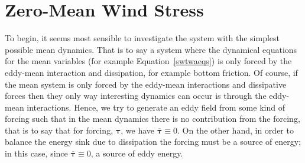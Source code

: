 \documentclass[12pt,a4paper]{report}
\newcommand*\thkmean[1]{\overline{#1}}
\newcommand*\equref[1]{Equation~\eqref{#1}}
\begin{document}



\section{Zero-Mean Wind Stress}

\label{stochwind}

To begin, it seems most sensible to investigate the 
system with the simplest possible mean dynamics.
That is to say a system where the dynamical equations 
for the mean variables (for example \equref{swtwaeqs}) is 
only forced by the eddy-mean interaction and dissipation,
for example bottom friction. Of course, if the mean system is
only forced by the eddy-mean interactions and dissipative forces
then they only way interesting dynamics can occur
is through the eddy-mean interactions. Hence, we try to
generate an eddy field from some kind of forcing such that in the mean 
dynamics there is no contribution from the forcing, that is to say
that for forcing, $\boldsymbol{\tau}$, we have $\thkmean{\boldsymbol{\tau}}\equiv0$.
On the other hand, in order to balance the energy sink due to dissipation the forcing
must be a source of energy; in this case, since $\thkmean{\boldsymbol{\tau}}\equiv0$,
a source of eddy energy.
\end{document}
